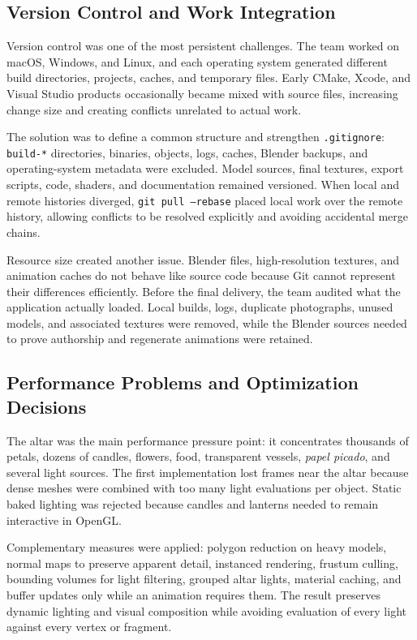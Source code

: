 \documentclass[letter,12pt]{article}
\begin{document}
	\subsection{Version Control and Work Integration}
	Version control was one of the most persistent challenges. The team worked on macOS, Windows, and Linux, and each operating system generated different build directories, projects, caches, and temporary files. Early CMake, Xcode, and Visual Studio products occasionally became mixed with source files, increasing change size and creating conflicts unrelated to actual work.

	The solution was to define a common structure and strengthen \texttt{.gitignore}: \texttt{build-*} directories, binaries, objects, logs, caches, Blender backups, and operating-system metadata were excluded. Model sources, final textures, export scripts, code, shaders, and documentation remained versioned. When local and remote histories diverged, \texttt{git pull --rebase} placed local work over the remote history, allowing conflicts to be resolved explicitly and avoiding accidental merge chains.

	Resource size created another issue. Blender files, high-resolution textures, and animation caches do not behave like source code because Git cannot represent their differences efficiently. Before the final delivery, the team audited what the application actually loaded. Local builds, logs, duplicate photographs, unused models, and associated textures were removed, while the Blender sources needed to prove authorship and regenerate animations were retained.

	\subsection{Performance Problems and Optimization Decisions}
	The altar was the main performance pressure point: it concentrates thousands of petals, dozens of candles, flowers, food, transparent vessels, \textit{papel picado}, and several light sources. The first implementation lost frames near the altar because dense meshes were combined with too many light evaluations per object. Static baked lighting was rejected because candles and lanterns needed to remain interactive in OpenGL.

	Complementary measures were applied: polygon reduction on heavy models, normal maps to preserve apparent detail, instanced rendering, frustum culling, bounding volumes for light filtering, grouped altar lights, material caching, and buffer updates only while an animation requires them. The result preserves dynamic lighting and visual composition while avoiding evaluation of every light against every vertex or fragment.
\end{document}
